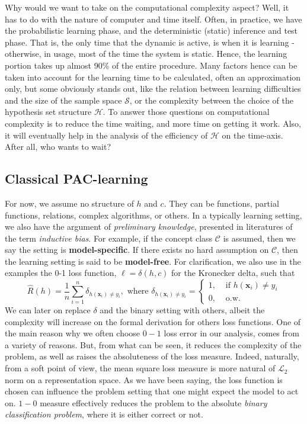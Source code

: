 Why would we want to take on the computational complexity aspect? Well, it has to do with the nature of computer and time itself. Often, in practice, we have the probabilistic learning phase, and the deterministic (static) inference and test phase. That is, the only time that the dynamic is active, is when it is learning - otherwise, in usage, most of the time the system is static. Hence, the learning portion takes up almost 90\% of the entire procedure. Many factors hence can be taken into account for the learning time to be calculated, often an approximation only, but some obviously stands out, like the relation between learning difficulties and the size of the sample space $\mathcal{S}$, or the complexity between the choice of the hypothesis set structure $\mathcal{H}$. To answer those questions on computational complexity is to reduce the time waiting, and more time on getting it work. Also, it will eventually help in the analysis of the efficiency of $\mathcal{H}$ on the time-axis. After all, who wants to wait?

\subsection{Classical PAC-learning}
For now, we assume no structure of $h$ and $c$. They can be functions, partial functions, relations, complex algorithms, or others. In a typically learning setting, we also have the argument of \textit{preliminary knowledge}, presented in literatures of the term \textit{inductive bias}. For example, if the concept class $\mathcal{C}$ is assumed, then we say the setting is \textbf{model-specific}. If there exists no hard assumption on $\mathcal{C}$, then the learning setting is said to be \textbf{model-free}. For clarification, we also use in the examples the 0-1 loss function, $\ell= \delta(h,c)$ for the Kronecker delta, such that \begin{equation}
    \hat{R}(h)=\frac{1}{n}\sum^n_{i=1}\delta_{h(\mathbf{x}_i)\ne y_i}, \mbox{ where }\delta_{h(\mathbf{x}_i)\ne y_i}=\begin{cases}
        1,&\mbox{ if $h(\mathbf{x}_i)\ne y_i$}\\
        0,&\mbox{ o.w.}
        \end{cases}
\end{equation} 
We can later on replace $\delta$ and the binary setting with others, albeit the complexity will increase on the formal derivation for others loss functions. One of the main reason why we often choose $0-1$ loss error in our analysis, comes from a variety of reasons. But, from what can be seen, it reduces the complexity of the problem, as well as raises the absoluteness of the loss measure. Indeed, naturally, from a soft point of view, the mean square loss measure is more natural of $\mathcal{L}_{2}$ norm on a representation space. As we have been saying, the loss function is chosen can influence the problem setting that one might expect the model to act on. $1-0$ measure effectively reduces the problem to the absolute \textit{binary classification problem}, where it is either correct or not. 

